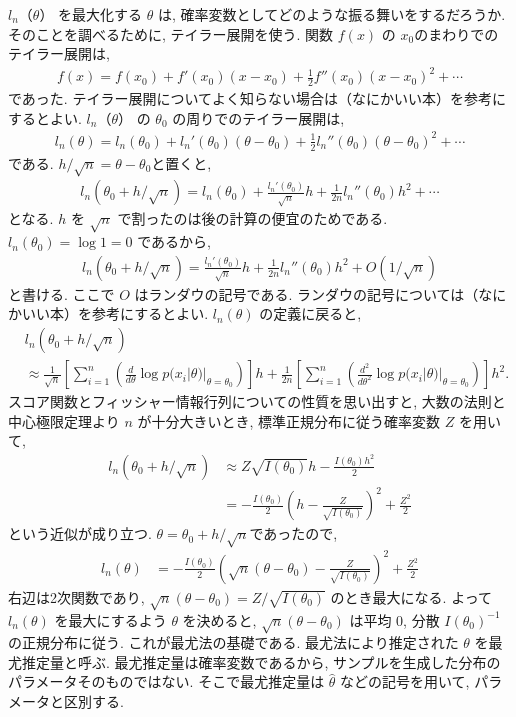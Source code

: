 \documentclass{jarticle}
\begin{document}
$l_n（\theta）$ を最大化する $\theta$ は, 確率変数としてどのような振る舞いをするだろうか. 
そのことを調べるために, テイラー展開を使う. 
関数 $f(x)$ の $x_0$のまわりでのテイラー展開は, 
\begin{align}
f(x)= f(x_0) +f'(x_0) (x-x_0) + \frac{1}{2}f''(x_0)(x-x_0)^2 + \cdots 
\end{align}
であった. テイラー展開についてよく知らない場合は（なにかいい本）を参考にするとよい. 
$l_n（\theta）$ の $\theta_0$ の周りでのテイラー展開は, 
\begin{align}
l_n(\theta)= l_n(\theta_0) +l_n'(\theta_0) (\theta-\theta_0) + \frac{1}{2}l_n''(\theta_0)(\theta-\theta_0)^2 + \cdots 
\end{align}
である. 
$h/\sqrt{n}=\theta-\theta_0$と置くと, 
\begin{align}
l_n(\theta_0 + h/\sqrt{n})= l_n(\theta_0) +\frac{l_n'(\theta_0)}{\sqrt{n}}h+ \frac{1}{2n}l_n''(\theta_0)h^2 + \cdots 
\end{align}
となる. $h$ を $\sqrt{n}$ で割ったのは後の計算の便宜のためである.
$l_n(\theta_0) = \log{1} =0$ であるから, 
\begin{align}
l_n(\theta _0+ h/\sqrt{n})= \frac{l_n'(\theta_0)}{\sqrt{n}}h+ \frac{1}{2n}l_n''(\theta_0)h^2 + O(1/\sqrt{n})
\end{align}
と書ける.  ここで $O$ はランダウの記号である. ランダウの記号については（なにかいい本）を参考にするとよい. 
$l_n(\theta)$ の定義に戻ると, 
\begin{align}
&l_n(\theta_0 + h/\sqrt{n})  \nonumber \\
&\approx \frac{1}{\sqrt{n}} \left[\sum_{i=1}^{n} \left( \frac{d}{d \theta}  \log p(x_i | \theta) |_{\theta=\theta_0} \right)\right] h+ \frac{1}{2n}\left[  \sum_{i=1}^{n}\left(\frac{d^2}{d \theta^2} \log p(x_i | \theta)|_{\theta=\theta_0}\right)\right] h^2. 
\end{align}
スコア関数とフィッシャー情報行列についての性質を思い出すと, 大数の法則と中心極限定理より $n$ が十分大きいとき,  標準正規分布に従う確率変数 $Z$ を用いて, 
\begin{align}
l_n(\theta_0 + h/\sqrt{n}) &\approx Z \sqrt{I(\theta_0)} h  - \frac{I(\theta_0) h^2}{2} \\
&= -\frac{I(\theta_0)}{2}\left(h - \frac{Z}{\sqrt{I(\theta_0)}}\right)^2 + \frac{Z^2}{2}
\end{align}
という近似が成り立つ. $\theta=\theta_0 + h/\sqrt{n}$であったので,
\begin{align}
l_n(\theta)&= -\frac{I(\theta_0)}{2}\left(\sqrt{n}(\theta - \theta_0 )- \frac{Z}{\sqrt{I(\theta_0)}}\right)^2 + \frac{Z^2}{2}
\label{reslik}
\end{align}
右辺は2次関数であり, $\sqrt{n}(\theta - \theta_0) = Z/\sqrt{I(\theta_0)}$ のとき最大になる.
よって $l_n(\theta)$ を最大にするよう $\theta$ を決めると, $\sqrt{n}(\theta - \theta_0)$ は平均 0, 分散 $I(\theta_0)^{-1}$ の正規分布に従う.
これが最尤法の基礎である.
最尤法により推定された $\theta$ を最尤推定量と呼ぶ. 最尤推定量は確率変数であるから, サンプルを生成した分布のパラメータそのものではない. 
そこで最尤推定量は $\hat \theta$ などの記号を用いて, パラメータと区別する. 
\end{document}
